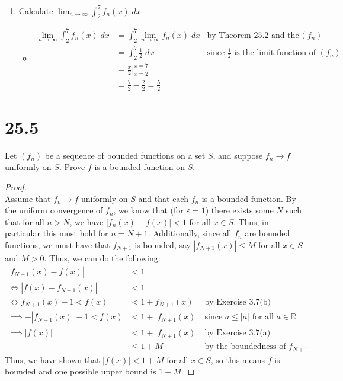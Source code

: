 \documentclass[10pt,a4paper]{article}
\theoremstyle{definition}
\begin{document}
\begin{enumerate}[label =(\alph*)]
\begin{itemize}
	\end{itemize}
\item Calculate $\displaystyle \lim_{n \to \infty} \int_2^7 f_n(x) \; dx$
	\begin{itemize}
	\item \begin{align*}
	\lim_{n \to \infty} \int_2^7 f_n(x) \; dx &= \int_2^7 \lim_{n \to \infty} f_n(x) \; dx &\text{by Theorem 25.2 and the uniform convergence of $(f_n)$}\\
	&= \int_2^7 \frac{1}{2} \; dx &\text{since $\frac{1}{2}$ is the limit function of $(f_n)$}\\
	&= \frac{x}{2} \bigg|_{x = 2}^{x = 7}\\
	&= \frac{7}{2} - \frac{2}{2} = \boxed{\frac{5}{2}}
	\end{align*}
	\end{itemize}
\end{enumerate}

\section*{25.5}
Let $(f_n)$ be a sequence of bounded functions on a set $S$, and suppose $f_n \to f$ uniformly on $S$. Prove $f$ is a bounded function on $S$.

\begin{proof}{$ $}
\\Assume that $f_n \to f$ uniformly on $S$ and that each $f_n$ is a bounded function. By the uniform convergence of $f_n$, we know that (for $\varepsilon = 1$) there exists some $N$ such that for all $n > N$, we have $|f_n(x) - f(x)| < 1$ for all $x \in S$. Thus, in particular this must hold for $n = N + 1$. Additionally, since all $f_n$ are bounded functions, we must have that $f_{N+1}$ is bounded, say $|f_{N+1}(x)| \leq M$ for all $x \in S$ and $M > 0$. Thus, we can do the following:
\begin{align*}
|f_{N+1}(x) - f(x)| &< 1\\
\iff |f(x) - f_{N+1}(x)| &< 1\\
\iff f_{N+1}(x) - 1 < f(x) &< 1 + f_{N+1}(x) &\text{by Exercise 3.7(b)}\\
\implies -|f_{N+1}(x)| - 1 < f(x) &< 1 + |f_{N+1}(x)| &\text{since $a \leq |a|$ for all $a \in \mathbb{R}$}\\
\implies |f(x)| &< 1 + |f_{N+1}(x)| &\text{by Exercise 3.7(a)}\\
&\leq 1 + M &\text{by the boundedness of $f_{N+1}$}
\end{align*}
Thus, we have shown that $|f(x)| < 1 + M$ for all $x \in S$, so this means $f$ is bounded and one possible upper bound is $1 + M$.
\end{proof}
\end{document}
